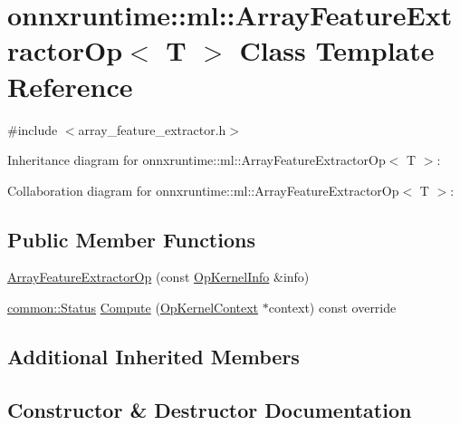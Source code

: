 \hypertarget{classonnxruntime_1_1ml_1_1ArrayFeatureExtractorOp}{}\section{onnxruntime\+:\+:ml\+:\+:Array\+Feature\+Extractor\+Op$<$ T $>$ Class Template Reference}
\label{classonnxruntime_1_1ml_1_1ArrayFeatureExtractorOp}


{\ttfamily \#include $<$array\+\_\+feature\+\_\+extractor.\+h$>$}



Inheritance diagram for onnxruntime\+:\+:ml\+:\+:Array\+Feature\+Extractor\+Op$<$ T $>$\+:


Collaboration diagram for onnxruntime\+:\+:ml\+:\+:Array\+Feature\+Extractor\+Op$<$ T $>$\+:
\subsection*{Public Member Functions}
\begin{DoxyCompactItemize}
\item 
\mbox{\hyperlink{classonnxruntime_1_1ml_1_1ArrayFeatureExtractorOp_a55eacc41892d2a580c0cac6e66d83a74}{Array\+Feature\+Extractor\+Op}} (const \mbox{\hyperlink{classonnxruntime_1_1OpKernelInfo}{Op\+Kernel\+Info}} \&info)
\item 
\mbox{\hyperlink{classonnxruntime_1_1common_1_1Status}{common\+::\+Status}} \mbox{\hyperlink{classonnxruntime_1_1ml_1_1ArrayFeatureExtractorOp_a4becdca227976dbb9dbf2ecec4bb0ad5}{Compute}} (\mbox{\hyperlink{classonnxruntime_1_1OpKernelContext}{Op\+Kernel\+Context}} $\ast$context) const override
\end{DoxyCompactItemize}
\subsection*{Additional Inherited Members}


\subsection{Constructor \& Destructor Documentation}
\mbox{\label{classonnxruntime_1_1ml_1_1ArrayFeatureExtractorOp_a55eacc41892d2a580c0cac6e66d83a74}} 
